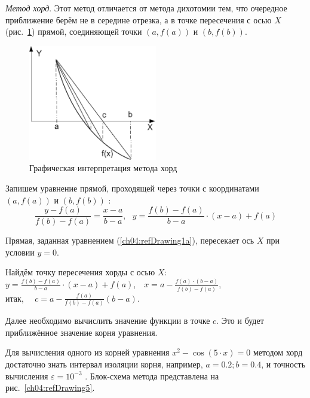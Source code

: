 \emph{Метод хорд}. Этот метод отличается от метода дихотомии тем, что очередное приближение берём не в
середине отрезка, а в точке пересечения с осью $X$ (рис.~\ref{ch04:refDrawing4}) прямой, соединяющей точки 
$(a,f(a))$ и  $(b,f(b))$.

\begin{figure}[htb]
\begin{center}
\includegraphics[width=0.5\textwidth]{img/ris_4_5}
\caption{Графическая интерпретация метода хорд}
\label{ch04:refDrawing4}
\end{center}
\end{figure}

Запишем уравнение прямой, проходящей через точки с координатами   $(a,f(a))$  и  $(b,f(b))$ :
\begin{equation}\label{ch04:refDrawing1a}
\frac{y-f(a)}{f(b)-f(a)}=\frac{x-a}{b-a},\ \ \  y=\frac{f(b)-f(a)}{b-a}\cdot (x-a)+f(a)
\end{equation}

Прямая, заданная уравнением (\ref{ch04:refDrawing1a}), пересекает ось $X$ при условии $y=0$.

Найдём точку пересечения хорды с осью $X$:\\
${y=\frac{f(b)-f(a)}{b-a}\cdot (x-a)+f(a)}$,\ \  ${x=a-\frac{f(a)\cdot (b-a)}{f(b)-f(a)}}$,\\ 
итак, \ \  ${c=a-\frac{f(a)}{f(b)-f(a)}(b-a)}$.

Далее необходимо вычислить значение функции в точке $c$. Это и будет приближённое значение корня
уравнения.

Для вычисления одного из корней уравнения  $x^2-\cos (5\cdot x)=0$  методом хорд достаточно знать интервал изоляции
корня, например,  $a=0.2;b=0.4$, и точность вычисления  $\varepsilon=10^{-3}$ . Блок-схема метода представлена на 
рис.~\ref{ch04:refDrawing5}. 

